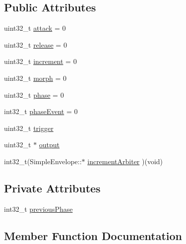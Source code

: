 \subsection*{Public Attributes}
\begin{DoxyCompactItemize}
\item 
uint32\+\_\+t \mbox{\hyperlink{class_simple_envelope_acc118c5a74cb3373b48853916de74ce1}{attack}} = 0
\item 
uint32\+\_\+t \mbox{\hyperlink{class_simple_envelope_a0776a9109e91358cc570b639e9437081}{release}} = 0
\item 
uint32\+\_\+t \mbox{\hyperlink{class_simple_envelope_a67a284db902cdd8ea5a98534ee98919d}{increment}} = 0
\item 
uint32\+\_\+t \mbox{\hyperlink{class_simple_envelope_ad17757bb65fb92738039ab3b2c491598}{morph}} = 0
\item 
uint32\+\_\+t \mbox{\hyperlink{class_simple_envelope_a20f0e52c5fb52d053229ae138486b11a}{phase}} = 0
\item 
int32\+\_\+t \mbox{\hyperlink{class_simple_envelope_a3d9297ae4a3058743fb0311d698015e4}{phase\+Event}} = 0
\item 
uint32\+\_\+t \mbox{\hyperlink{class_simple_envelope_a1de4ca7380abf92d8e7d1a2643e0e20d}{trigger}}
\item 
uint32\+\_\+t $\ast$ \mbox{\hyperlink{class_simple_envelope_ac15b5b29f933474b1849994cf3bd11eb}{output}}
\item 
int32\+\_\+t(Simple\+Envelope\+::$\ast$ \mbox{\hyperlink{class_simple_envelope_a9142a7c1dad70d38081b5bf5f36a0bf2}{increment\+Arbiter}} )(void)
\end{DoxyCompactItemize}
\subsection*{Private Attributes}
\begin{DoxyCompactItemize}
\item 
int32\+\_\+t \mbox{\hyperlink{class_simple_envelope_aa31e875f02278ee2d62fc38773bb1399}{previous\+Phase}}
\end{DoxyCompactItemize}


\subsection{Member Function Documentation}
\mbox{\label{class_simple_envelope_a4d0202e556234d3c967644fd1bea6fff}} 
